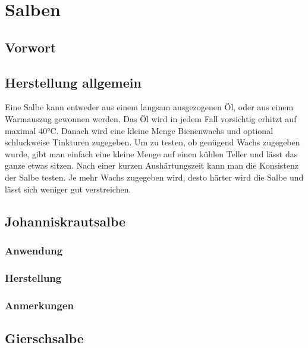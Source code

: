 \chapter{Salben}

\section{Vorwort}

\lipsum[1-2]




\section{Herstellung allgemein}

Eine Salbe kann entweder aus einem langsam ausgezogenen Öl, oder aus einem Warmauszug gewonnen werden. Das Öl wird in jedem Fall vorsichtig erhitzt auf maximal 40°C. Danach wird eine kleine Menge Bienenwachs und optional schluckweise Tinkturen zugegeben. Um zu testen, ob genügend Wachs zugegeben wurde, gibt man einfach eine kleine Menge auf einen kühlen Teller und lässt das ganze etwas sitzen. Nach einer kurzen Aushärtungszeit kann man die Konsistenz der Salbe testen. Je mehr Wachs zugegeben wird, desto härter wird die Salbe und lässt sich weniger gut verstreichen.



\section{Johanniskrautsalbe}

\subsection{Anwendung}

\subsection{Herstellung}

\subsection{Anmerkungen}


\newpage


\section{Gierschsalbe}

